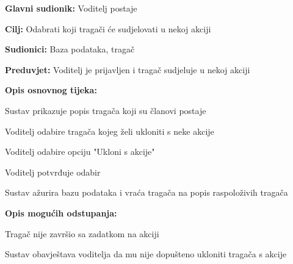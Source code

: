 					\noindent {}
					\begin{packed_item}
						
						\item \textbf{Glavni sudionik:} Voditelj postaje
						\item \textbf{Cilj:} Odabrati koji tragači će sudjelovati u nekoj akciji
						\item \textbf{Sudionici:} Baza podataka, tragač
						\item \textbf{Preduvjet:} Voditelj je prijavljen i tragač sudjeluje u nekoj akciji
						\item \textbf{Opis osnovnog tijeka:}
						
						\item[] \begin{packed_enum}
							
							\item Sustav prikazuje popis tragača koji su članovi postaje 
							\item Voditelj odabire tragača kojeg želi ukloniti s neke akcije
							\item Voditelj odabire opciju "Ukloni s akcije"
							\item Voditelj potvrđuje odabir
							\item Sustav ažurira bazu podataka i vraća tragača na popis raspoloživih tragača
						\end{packed_enum}
						
						\item  \textbf{Opis mogućih odstupanja:}
						
						\item[] \begin{packed_item}
							
							\item[3.a] Tragač nije završio sa zadatkom na akciji
							\item[] \begin{packed_enum}
								
								\item Sustav obavještava voditelja da mu nije dopušteno ukloniti tragača s akcije			
							\end{packed_enum}
							
						\end{packed_item}
						
					\end{packed_item}
					
